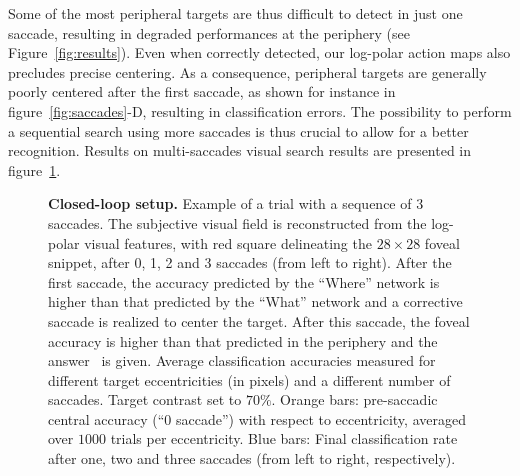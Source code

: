 
Some of the most peripheral targets are thus difficult to detect in just one saccade, resulting in degraded performances at the periphery (see Figure~\ref{fig:results}). Even when correctly detected, our log-polar action maps also precludes precise centering. As a consequence, peripheral targets are generally poorly centered after the first saccade, as shown for instance in figure~\ref{fig:saccades}-D, resulting in classification errors. The possibility to perform a sequential search using more saccades is thus crucial to allow for a better recognition.
Results on multi-saccades visual search results are presented in figure~\ref{fig:results-saccades}.


\begin{figure}[t!]%
	\caption{
		{\bf Closed-loop setup.} %
		\A Example of a trial with a sequence of 3 saccades. The subjective visual field is reconstructed from the log-polar visual features, with red square delineating the $28\times28$ foveal snippet, after 0, 1, 2 and 3 saccades (from left to right). After the first saccade, the accuracy predicted by the ``Where'' network is higher than that predicted by the ``What'' network and a corrective saccade is realized to center the target. After this saccade, the foveal accuracy is higher than that predicted in the periphery and the answer \ANS\ is given. %
		\B Average classification accuracies measured for different target eccentricities (in pixels) and a different number of saccades. Target contrast set to $70\%$. Orange bars: pre-saccadic central accuracy (``0 saccade'') with respect to eccentricity, averaged over $1000$ trials per eccentricity. Blue bars: Final classification rate after one, two and three saccades (from left to right, respectively).
		\label{fig:results-saccades}}%
\end{figure}%

